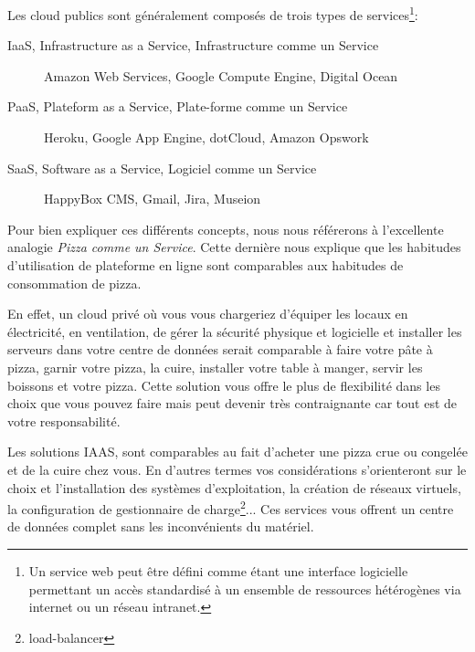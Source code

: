 \documentclass[11pt, a4paper ]{article}
\begin{document}
\begin{spacing}{1.5}
Les cloud publics sont généralement composés de trois types de services\footnote{Un service web\cite{webServicesDef} peut être défini comme étant une interface logicielle permettant un accès standardisé à un ensemble de ressources hétérogènes via internet ou un réseau intranet.}:
\begin{description}

	\item[IaaS, Infrastructure as a Service, Infrastructure comme un Service] Amazon Web Services, Google Compute Engine, Digital Ocean

	\item[PaaS, Plateform as a Service, Plate-forme comme un Service] Heroku, Google App Engine, dotCloud, Amazon Opswork

	\item[SaaS, Software as a Service, Logiciel comme un Service]
	HappyBox CMS, Gmail, Jira, Museion

\end{description}

Pour bien expliquer ces différents concepts, nous nous référerons à l'excellente analogie \emph{Pizza comme un Service}\cite{PizzaasaService}. Cette dernière nous explique que les habitudes d'utilisation de plateforme en ligne sont comparables aux habitudes de consommation de pizza.

En effet, un cloud privé où vous vous chargeriez d'équiper les locaux en électricité, en ventilation, de gérer la sécurité physique et logicielle et installer les serveurs dans votre centre de données serait comparable à faire votre pâte à pizza, garnir votre pizza, la cuire, installer votre table à manger, servir les boissons et votre pizza. Cette solution vous offre le plus de flexibilité dans les choix que vous pouvez faire mais peut devenir très contraignante car tout est de votre responsabilité.

Les solutions IAAS, sont comparables au fait d'acheter une pizza crue ou congelée et de la cuire chez vous. En d'autres termes vos considérations s'orienteront sur le choix et l'installation des systèmes d'exploitation, la création de réseaux virtuels, la configuration de gestionnaire de charge\footnote{load-balancer}... Ces services vous offrent un centre de données complet sans les inconvénients du matériel.


\end{spacing}
\end{document}
